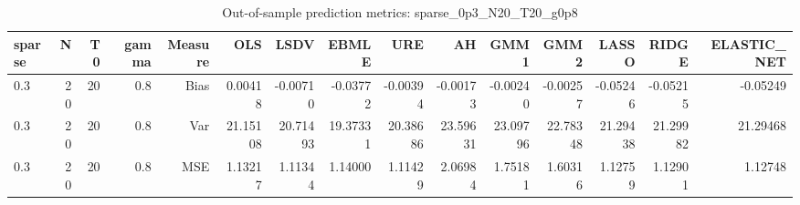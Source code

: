 \begin{table}[!htbp]\centering
\caption{Out-of-sample prediction metrics: sparse_0p3_N20_T20_g0p8}
\label{tab:table3_sparse_0p3_N20_T20_g0p8}
\begin{tabular}{lrrrrrrrrrrrrrr}
\hline
sparse & N & T0 & gamma & Measure & OLS & LSDV & EBMLE & URE & AH & GMM1 & GMM2 & LASSO & RIDGE & ELASTIC_NET \\
\hline
0.3 & 20 & 20 & 0.8 & Bias & 0.00418 & -0.00710 & -0.03772 & -0.00394 & -0.00173 & -0.00240 & -0.00257 & -0.05246 & -0.05215 & -0.05249 \\
0.3 & 20 & 20 & 0.8 & Var & 21.15108 & 20.71493 & 19.37331 & 20.38686 & 23.59631 & 23.09796 & 22.78348 & 21.29438 & 21.29982 & 21.29468 \\
0.3 & 20 & 20 & 0.8 & MSE & 1.13217 & 1.11344 & 1.14000 & 1.11429 & 2.06984 & 1.75181 & 1.60316 & 1.12759 & 1.12901 & 1.12748 \\
\hline
\end{tabular}
\end{table}

